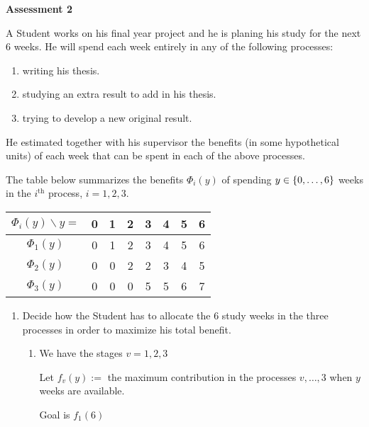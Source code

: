 \begin{center}
    \textbf{Assessment 2}
\end{center}

\setcounter{prob}{0}

\begin{prob} %
A Student works on his final year project and he is planing his
study for the next 6 weeks. He will spend each week entirely in any of the following
processes:
\begin{enumerate}[label = {\arabic*)}]
    \item writing his thesis.
    \item studying an extra result to add in his thesis.
    \item trying to develop a new original result.
\end{enumerate}

He estimated together with his supervisor the benefits (in some hypothetical units) of each week that can be spent in each of the above processes. 

The table
below summarizes the benefits $\Phi_i(y)$ of spending $y \in \left\{0, \dots , 6\right\}$ weeks in the $i^{\text{th}}$ process, $i = 1, 2, 3$.

\begin{tabular}{||c||c|c|c|c|c|c|c||} \hline
  $\Phi_i(y) \backslash y=$   & 0 & 1 & 2 & 3 & 4 & 5 & 6  \\ \hline
  $\Phi_1(y)$  & 0 & 1 & 2 & 3 & 4 & 5 & 6  \\ \hline
  $\Phi_2(y)$  & 0 & 0 & 2 & 2 & 3 & 4 & 5  \\ \hline
  $\Phi_3(y)$  & 0 & 0 & 0 & 5 & 5 & 6 & 7  \\ \hline
\end{tabular}

\begin{enumerate}[label = {\textbf{(\greek*)}}]
    \item Decide how the Student has to allocate the 6 study weeks in the three processes in order to maximize his total benefit.
    
    \begin{sol}
    \begin{enumerate}[start = 1, label = {\protect\tsc{$\mathbf{S_{\arabic*}}$}}]
    \item We have the stages $v=1,2,3$

Let $f_v(y):=$ the maximum contribution in the processes $v,\dots,3$ when $y$ weeks are available.

Goal is $f_1(6)$


\end{enumerate}
\end{sol}
\end{enumerate}
\end{prob}
